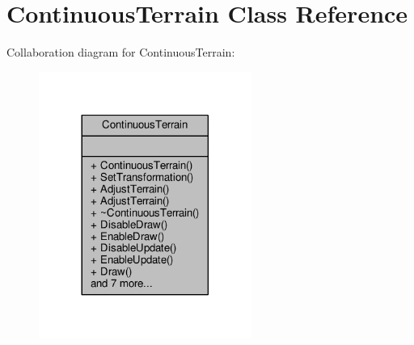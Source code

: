 \hypertarget{classContinuousTerrain}{}\section{Continuous\+Terrain Class Reference}
\label{classContinuousTerrain}


Collaboration diagram for Continuous\+Terrain\+:
\nopagebreak
\begin{figure}[H]
\begin{center}
\leavevmode
\includegraphics[width=197pt]{d6/d7e/classContinuousTerrain__coll__graph}
\end{center}
\end{figure}
